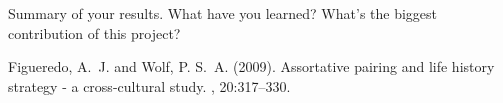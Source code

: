 \documentclass[twoside]{article}
\begin{document}
Summary of your results. What have you learned? What’s the biggest contribution of this project?\\

\lipsum[5] %



\begin{thebibliography}{99} %

Figueredo, A.~J. and Wolf, P. S.~A. (2009).
\newblock Assortative pairing and life history strategy - a cross-cultural
  study.
, 20:317--330.
 
\end{thebibliography}

\end{document}

